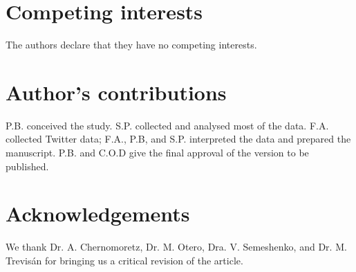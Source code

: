 \documentclass{bmcart}
\begin{document}

\begin{backmatter}

\section*{Competing interests}
  The authors declare that they have no competing interests.

\section*{Author's contributions}
P.B. conceived the study. S.P. collected and analysed most of the data. F.A. collected Twitter data; F.A., P.B, and S.P. interpreted the data and prepared the manuscript. P.B. and C.O.D  give the final approval of the version to be published.

\section*{Acknowledgements}
  We thank Dr. A. Chernomoretz, Dr. M. Otero, Dra. V. Semeshenko, and Dr. M. Trevis\'an for bringing us a critical revision of the article.



\end{backmatter}
\end{document}
